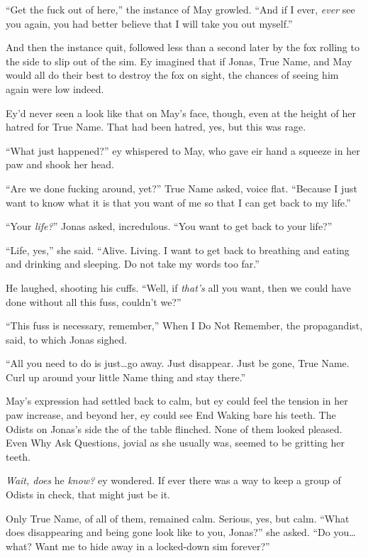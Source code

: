 ``Get the fuck out of here,'' the instance of May growled. ``And if I ever, \emph{ever} see you again, you had better believe that I will take you out myself.''

And then the instance quit, followed less than a second later by the fox rolling to the side to slip out of the sim. Ey imagined that if Jonas, True Name, and May would all do their best to destroy the fox on sight, the chances of seeing him again were low indeed.

Ey'd never seen a look like that on May's face, though, even at the height of her hatred for True Name. That had been hatred, yes, but this was rage.

``What just happened?'' ey whispered to May, who gave eir hand a squeeze in her paw and shook her head.

``Are we done fucking around, yet?'' True Name asked, voice flat. ``Because I just want to know what it is that you want of me so that I can get back to my life.''

``Your \emph{life?}'' Jonas asked, incredulous. ``You want to get back to your life?''

``Life, yes,'' she said. ``Alive. Living. I want to get back to breathing and eating and drinking and sleeping. Do not take my words too far.''

He laughed, shooting his cuffs. ``Well, if \emph{that's} all you want, then we could have done without all this fuss, couldn't we?''

``This fuss is necessary, remember,'' When I Do Not Remember, the propagandist, said, to which Jonas sighed.

``All you need to do is just\ldots go away. Just disappear. Just be gone, True Name. Curl up around your little Name thing and stay there.''

May's expression had settled back to calm, but ey could feel the tension in her paw increase, and beyond her, ey could see End Waking bare his teeth. The Odists on Jonas's side the of the table flinched. None of them looked pleased. Even Why Ask Questions, jovial as she usually was, seemed to be gritting her teeth.

\emph{Wait, does} he \emph{know?} ey wondered. If ever there was a way to keep a group of Odists in check, that might just be it.

Only True Name, of all of them, remained calm. Serious, yes, but calm. ``What does disappearing and being gone look like to you, Jonas?'' she asked. ``Do you\ldots what? Want me to hide away in a locked-down sim forever?''

